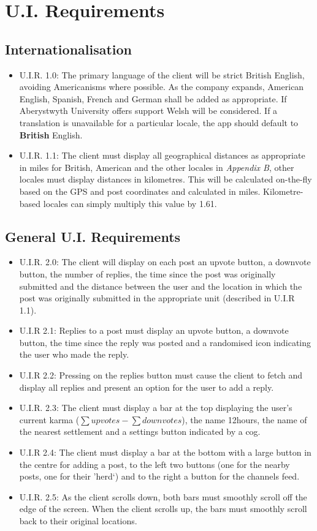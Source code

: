 \documentclass[12pt, a4paper]{article}
\begin{document}
\section{U.I. Requirements}
\subsection{Internationalisation}
\begin{itemize}
\item U.I.R. 1.0: The primary language of the client will be strict British English, avoiding Americanisms where possible. As the company expands, American English, Spanish, French and German shall be added as appropriate. If Aberystwyth University offers support Welsh will be considered. If a translation is unavailable for a particular locale, the app should default to \textbf{British} English.
\item U.I.R. 1.1: The client must display all geographical distances as appropriate in miles for British, American and the other locales in \textit{Appendix B}, other locales must display distances in kilometres. This will be calculated on-the-fly based on the GPS and post coordinates and calculated in miles. Kilometre-based locales can simply multiply this value by 1.61.
\end{itemize}

\subsection{General U.I. Requirements}
\begin{itemize}
\item U.I.R. 2.0: The client will display on each post an upvote button, a downvote button, the number of replies, the time since the post was originally submitted and the distance between the user and the location in which the post was originally submitted in the appropriate unit (described in U.I.R 1.1).
\item U.I.R 2.1: Replies to a post must display an upvote button, a downvote button, the time since the reply was posted and a randomised icon indicating the user who made the reply. 
\item U.I.R 2.2: Pressing on the replies button must cause the client to fetch and display all replies and present an option for the user to add a reply.
\item U.I.R. 2.3: The client must display a bar at the top displaying the user's current karma ($\sum upvotes - \sum downvotes$), the name 12hours, the name of the nearest settlement and a settings button indicated by a cog.
\item U.I.R 2.4: The client must display a bar at the bottom with a large button in the centre for adding a post, to the left two buttons (one for the nearby posts, one for their 'herd`) and to the right a button for the channels feed.
\item U.I.R. 2.5: As the client scrolls down, both bars must smoothly scroll off the edge of the screen. When the client scrolls up, the bars must smoothly scroll back to their original locations. 
\end{itemize}
\end{document}
